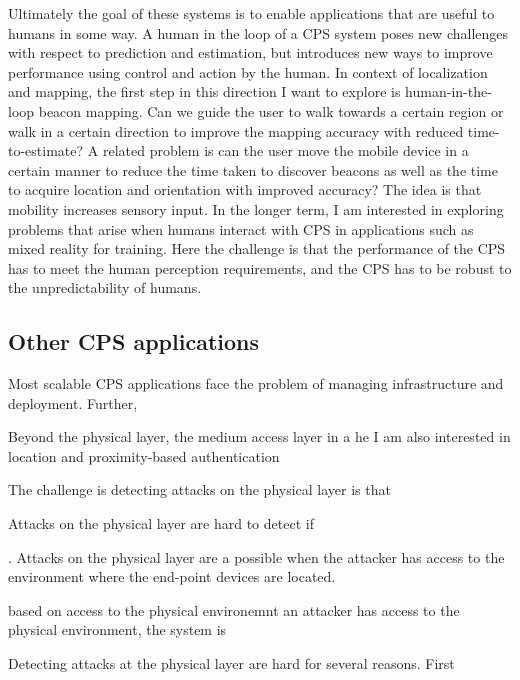 \documentclass[10pt]{article}
\begin{document}
Ultimately the goal of these systems is to enable applications that are useful to humans in some way.
A human in the loop of a CPS system poses new challenges with respect to prediction and estimation, but introduces new ways to improve performance using control and action by the human. In context of localization and mapping, the first step in this direction I want to explore is human-in-the-loop beacon mapping. Can we guide the user to walk towards a certain region or walk in a certain direction to improve the mapping accuracy with reduced time-to-estimate? A related problem is can the user move the mobile device in a certain manner to reduce the time taken to discover beacons as well as the time to acquire location and orientation with improved accuracy? The idea is that mobility increases sensory input. In the longer term, I am interested in exploring problems that arise when humans interact with CPS in applications such as mixed reality for training. Here the challenge is that the performance of the CPS has to meet the human perception requirements, and the CPS has to be robust to the unpredictability of humans. 

\subsection{Other CPS applications}
Most scalable CPS applications face the problem of managing infrastructure and deployment. Further, 



Beyond the physical layer, the medium access layer in a he
I am also interested in location and proximity-based authentication 

The challenge is detecting attacks on the physical layer is that 

Attacks on the physical layer are hard to detect if 

. Attacks on the physical layer are a possible when the attacker has access to the environment where the end-point devices are located.

 based on access to the physical environemnt
 an attacker has access to the physical environment, the system is 

Detecting attacks at the physical layer are hard for several reasons. First
\end{document}
